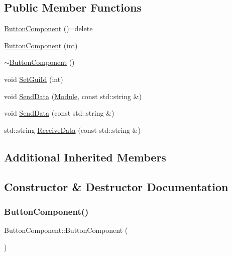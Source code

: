 \subsection*{Public Member Functions}
\begin{DoxyCompactItemize}
\item 
\mbox{\hyperlink{class_button_component_af881f265c858dd0a06b9640cbbcbb225}{Button\+Component}} ()=delete
\item 
\mbox{\hyperlink{class_button_component_a4c17ae07aa540d1e6725d872d53aec02}{Button\+Component}} (int)
\item 
\mbox{\hyperlink{class_button_component_a20b7fde7e004432a58107199b6e11001}{$\sim$\+Button\+Component}} ()
\item 
void \mbox{\hyperlink{class_button_component_a32986620f217bace2cbbd10fb73f34cd}{Set\+Gui\+Id}} (int)
\item 
void \mbox{\hyperlink{class_button_component_ab2bda034c7b604ed198d5c276b7fd045}{Send\+Data}} (\mbox{\hyperlink{_mediator_2_mediator_2_commons_8h_a88683b64d84542943724ba0f211153af}{Module}}, const std\+::string \&)
\item 
void \mbox{\hyperlink{class_button_component_a4eb3aac3bc35d95f8d703da25697917c}{Send\+Data}} (const std\+::string \&)
\item 
std\+::string \mbox{\hyperlink{class_button_component_a2f8433707fbd9c184ba359bc41f49305}{Receive\+Data}} (const std\+::string \&)
\end{DoxyCompactItemize}
\subsection*{Additional Inherited Members}


\subsection{Constructor \& Destructor Documentation}
\mbox{\label{class_button_component_af881f265c858dd0a06b9640cbbcbb225}} 
\subsubsection{\texorpdfstring{ButtonComponent()}{ButtonComponent()}\hspace{0.1cm}{\footnotesize\ttfamily [1/2]}}
{\footnotesize\ttfamily Button\+Component\+::\+Button\+Component (\begin{DoxyParamCaption}{ }\end{DoxyParamCaption})\hspace{0.3cm}{\ttfamily [delete]}}

